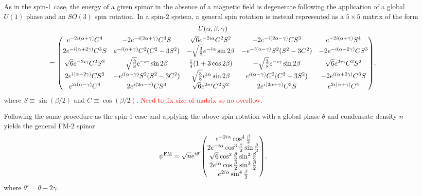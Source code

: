 As in the spin-1 case, the energy of a given spinor in the absence of a magnetic
field is degenerate following the application of a global \(U(1)\) phase and an
\(SO(3)\) spin rotation.
In a spin-2 system, a general spin rotation is instead represented as a
\(5\times 5\) matrix of the form
\begin{multline}\label{eq: spin-2-rotation-matrix}
    U(\alpha, \beta, \gamma) \\
    = \mqty(
    e^{-2i(\alpha + \gamma)}C^4 & -2e^{-i(2\alpha+\gamma)}C^3S
    & \sqrt{6}e^{-2i\alpha}C^2S^2 & -2e^{-i(2\alpha-\gamma)}CS^3
    & e^{-2i(\alpha + \gamma)}S^4
    \\
    2e^{-i(\alpha+2\gamma)}C^3S & e^{-i(\alpha+\gamma)}C^2(C^2-3S^2)
    & -\sqrt{\frac{3}{8}}e^{-i\alpha}\sin 2\beta
    & -e^{-i(\alpha-\gamma)}S^2(S^2-3C^2) & -2e^{-i(\alpha-2\gamma)}CS^3
    \\
    \sqrt{6}e^{-2i\gamma}C^2S^2 & \sqrt{\frac{3}{8}}e^{-i\gamma}\sin 2\beta
    & \frac{1}{4}(1+3\cos 2\beta)
    & -\sqrt{\frac{3}{8}}e^{-i\gamma}\sin 2\beta
    & \sqrt{6}e^{2i\gamma}C^2S^2
    \\
    2e^{i(\alpha-2\gamma)}CS^3 & -e^{i(\alpha-\gamma)}S^2(S^2-3C^2)
    & \sqrt{\frac{3}{8}}e^{i\alpha}\sin 2\beta
    & e^{i(\alpha-\gamma)}C^2(C^2-3S^2) & -2e^{i(\alpha+2\gamma)}C^3S
    \\
    e^{2i(\alpha - \gamma)}C^4 & 2e^{i(2\alpha-\gamma)}CS^3
    & \sqrt{6}e^{2i\alpha}C^2S^2 & 2e^{i(2\alpha+\gamma)}C^3S
    & e^{2i(\alpha + \gamma)}C^4
    ),
\end{multline}
where \(S \equiv \sin(\beta/2)\) and \(C \equiv \cos(\beta/2)\).
\textcolor{red}{Need to fix size of matrix so no overflow.}

Following the same procedure as the spin-1 case and applying the above spin
rotation with a global phase \(\theta \) and condensate density \(n\) yields the
general FM-2 spinor
\begin{equation}\label{eq: FM-2-representative-spinor}
    \psi^\mathrm{FM} = \sqrt{n}e^{i\theta'}\mqty(
    e^{-2i\alpha} \cos^4\frac{\beta}{2} \\
    2e^{-i\alpha}\cos^3\frac{\beta}{2}\sin \frac{\beta}{2} \\
    \sqrt{6} \cos^2\frac{\beta}{2} \sin^2\frac{\beta}{2} \\
    2e^{i\alpha}\cos\frac{\beta}{2} \sin^3\frac{\beta}{2} \\
    e^{2i\alpha} \sin^4\frac{\beta}{2}
    ),
\end{equation}
where \(\theta'=\theta-2\gamma \).

